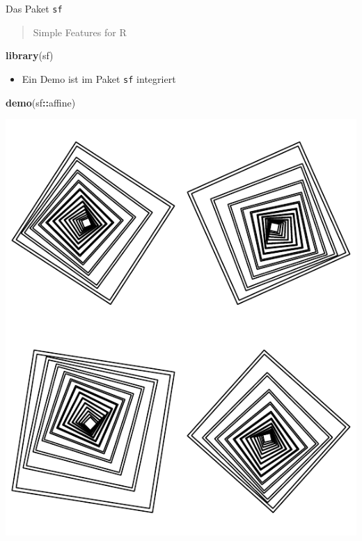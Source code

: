 \documentclass[ignorenonframetext,]{beamer}
\newenvironment{Shaded}{\begin{snugshade}}{\end{snugshade}}
\newcommand{\KeywordTok}[1]{\textcolor[rgb]{0.13,0.29,0.53}{\textbf{#1}}}
\newcommand{\OperatorTok}[1]{\textcolor[rgb]{0.81,0.36,0.00}{\textbf{#1}}}
\newcommand{\NormalTok}[1]{#1}
\providecommand{\tightlist}{%
  \setlength{\itemsep}{0pt}\setlength{\parskip}{0pt}}
\begin{document}
\begin{frame}[fragile]{Das Paket \texttt{sf}}

\begin{quote}
Simple Features for R
\end{quote}

\begin{Shaded}
\begin{Highlighting}[]
\KeywordTok{library}\NormalTok{(sf)}
\end{Highlighting}
\end{Shaded}

\begin{itemize}
\tightlist
\item
  Ein Demo ist im Paket \texttt{sf} integriert
\end{itemize}

\begin{Shaded}
\begin{Highlighting}[]
\KeywordTok{demo}\NormalTok{(sf}\OperatorTok{::}\NormalTok{affine)}
\end{Highlighting}
\end{Shaded}

\includegraphics{figure/Rplot.pdf}

\end{frame}
\end{document}
